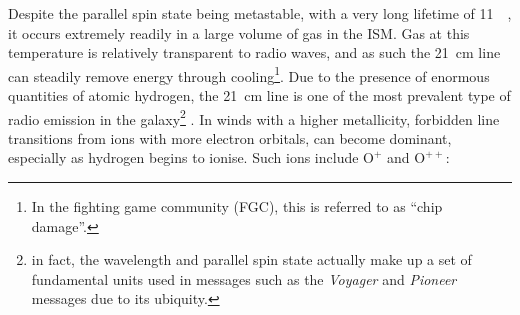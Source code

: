\noindent
Despite the parallel spin state being metastable, with a very long lifetime of \SI{11}{\mega\year}, it occurs extremely readily in a large volume of gas in the ISM.
Gas at this temperature is relatively transparent to radio waves, and as such the \SI{21}{cm} line can steadily remove energy through cooling\footnote{In the fighting game community (FGC), this is referred to as ``chip damage''.}.
Due to the presence of enormous quantities of atomic hydrogen, the \SI{21}{\centi\metre} line is one of the most prevalent type of radio emission in the galaxy\footnote{in fact, the wavelength and parallel spin state actually make up a set of fundamental units used in messages such as the \textit{Voyager} and \textit{Pioneer} messages due to its ubiquity.}
\parencite[Ch.~8]{drainePhysicsInterstellarIntergalactic2011}.
In winds with a higher metallicity, forbidden line transitions from ions with more electron orbitals, can become dominant, especially as hydrogen begins to ionise.
Such ions include $\text{O}^+$ and $\text{O}^{++}$:

